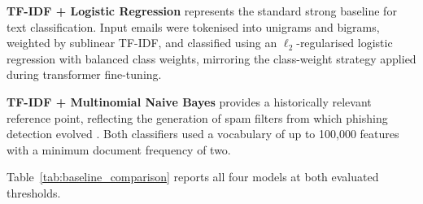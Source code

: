 \textbf{TF-IDF + Logistic Regression} represents the standard strong baseline for text classification. Input emails were tokenised into unigrams and bigrams, weighted by sublinear TF-IDF, and classified using an $\ell_2$-regularised logistic regression with balanced class weights, mirroring the class-weight strategy applied during transformer fine-tuning.

\textbf{TF-IDF + Multinomial Naive Bayes} provides a historically relevant reference point, reflecting the generation of spam filters from which phishing detection evolved \cite{metsis2006spam}. Both classifiers used a vocabulary of up to 100,000 features with a minimum document frequency of two.

Table~\ref{tab:baseline_comparison} reports all four models at both evaluated thresholds.

\begin{table}[htbp]
\centering
\caption{Phishing detection results on the held-out test set for classical baselines and fine-tuned transformer models.}
\label{tab:baseline_comparison}
\end{table}

